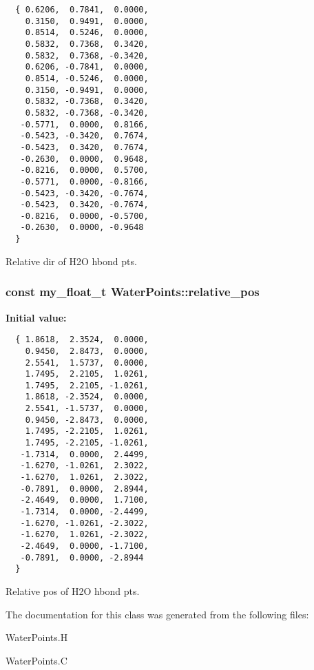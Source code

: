 \begin{Code}\begin{verbatim} 
  { 0.6206,  0.7841,  0.0000,
    0.3150,  0.9491,  0.0000,
    0.8514,  0.5246,  0.0000,
    0.5832,  0.7368,  0.3420,
    0.5832,  0.7368, -0.3420,
    0.6206, -0.7841,  0.0000,
    0.8514, -0.5246,  0.0000,
    0.3150, -0.9491,  0.0000,
    0.5832, -0.7368,  0.3420,
    0.5832, -0.7368, -0.3420,
   -0.5771,  0.0000,  0.8166,
   -0.5423, -0.3420,  0.7674,
   -0.5423,  0.3420,  0.7674,
   -0.2630,  0.0000,  0.9648,
   -0.8216,  0.0000,  0.5700,
   -0.5771,  0.0000, -0.8166,
   -0.5423, -0.3420, -0.7674,
   -0.5423,  0.3420, -0.7674,
   -0.8216,  0.0000, -0.5700,
   -0.2630,  0.0000, -0.9648
  }
\end{verbatim}\end{Code}
Relative dir of H2O hbond pts. 

\subsubsection{\setlength{\rightskip}{0pt plus 5cm}const my\_\-float\_\-t \bf{Water\-Points::relative\_\-pos}\hspace{0.3cm}{\tt  [static, private]}}\label{classSimSite3D_1_1WaterPoints_00f83dfce139f11e124c5258a68ffc7b}


\textbf{Initial value:}

\begin{Code}\begin{verbatim} 
  { 1.8618,  2.3524,  0.0000,
    0.9450,  2.8473,  0.0000,
    2.5541,  1.5737,  0.0000,
    1.7495,  2.2105,  1.0261,
    1.7495,  2.2105, -1.0261,
    1.8618, -2.3524,  0.0000,
    2.5541, -1.5737,  0.0000,
    0.9450, -2.8473,  0.0000,
    1.7495, -2.2105,  1.0261,
    1.7495, -2.2105, -1.0261,
   -1.7314,  0.0000,  2.4499,
   -1.6270, -1.0261,  2.3022,
   -1.6270,  1.0261,  2.3022,
   -0.7891,  0.0000,  2.8944,
   -2.4649,  0.0000,  1.7100,
   -1.7314,  0.0000, -2.4499,
   -1.6270, -1.0261, -2.3022,
   -1.6270,  1.0261, -2.3022,
   -2.4649,  0.0000, -1.7100,
   -0.7891,  0.0000, -2.8944
  }
\end{verbatim}\end{Code}
Relative pos of H2O hbond pts. 



The documentation for this class was generated from the following files:\begin{CompactItemize}
\item 
Water\-Points.H\item 
Water\-Points.C\end{CompactItemize}
